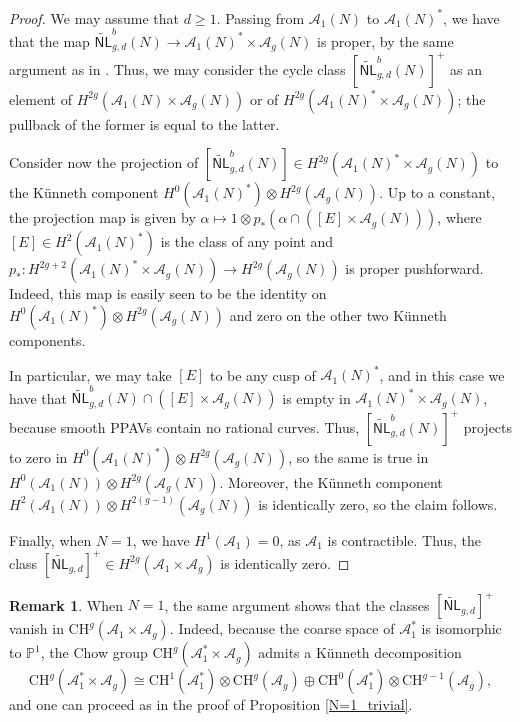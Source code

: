 \documentclass[12pt]{amsart}
\def\cA{\mathcal{A}}
\def\bP{\mathbb{P}}
\newcommand{\CH}{\mathrm{CH}}
\newcommand{\wNL}{{\widetilde{\mathsf{NL}}}}
\theoremstyle{definition}
\newtheorem{rem}[thm]{Remark}
\begin{document}
\begin{proof}
    We may assume that $d\ge 1$. Passing from $\cA_1(N)$ to $\cA_1(N)^*$, we have that the map $\wNL^b_{g,d}(N)\to \cA_1(N)^*\times\cA_g(N)$ is proper, by the same argument as in \cite[Lemma 3.4]{gl}. Thus, we may consider the cycle class $[\wNL^b_{g,d}(N)]^+$ as an element of $H^{2g}(\cA_1(N)\times\cA_g(N))$ or of $H^{2g}(\cA_1(N)^*\times\cA_g(N))$; the pullback of the former is equal to the latter. 
    
    Consider now the projection of $[\wNL^b_{g,d}(N)]\in H^{2g}(\cA_1(N)^*\times\cA_g(N))$ to the K\"{u}nneth component $H^{0}(\cA_1(N)^*)\otimes H^{2g}(\cA_g(N))$. Up to a constant, the projection map is given by $\alpha\mapsto 1\otimes p_{*}(\alpha\cap ([E]\times\cA_g(N)))$, where $[E]\in H^2(\cA_1(N)^*)$ is the class of any point and $p_{*}:H^{2g+2}(\cA_1(N)^*\times\cA_g(N))\to H^{2g}(\cA_g(N))$ is proper pushforward. Indeed, this map is easily seen to be the identity on $H^{0}(\cA_1(N)^*)\otimes H^{2g}(\cA_g(N))$ and zero on the other two K\"{u}nneth components.

    In particular, we may take $[E]$ to be any cusp of $\cA_1(N)^{*}$, and in this case we have that $\wNL^b_{g,d}(N)\cap ([E]\times \cA_g(N))$ is empty in $\cA_1(N)^*\times\cA_g(N)$, because smooth PPAVs contain no rational curves. Thus, $[\wNL^b_{g,d}(N)]^+$ projects to zero in $H^{0}(\cA_1(N)^*)\otimes H^{2g}(\cA_g(N))$, so the same is true in $H^{0}(\cA_1(N))\otimes H^{2g}(\cA_g(N))$. Moreover, the K\"{u}nneth component $H^{2}(\cA_1(N))\otimes H^{2(g-1)}(\cA_g(N))$ is identically zero, so the claim follows.
    
    Finally, when $N=1$, we have $H^{1}(\cA_1)=0$, as $\cA_1$ is contractible. Thus, the class $[\wNL_{g,d}]^+
    \in H^{2g}(\cA_1\times\cA_g)$ is identically zero.
\end{proof}

\begin{rem}\label{chow_vanish_remark}
When $N=1$, the same argument shows that the classes $[\wNL_{g,d}]^+$ vanish in $\CH^{g}(\cA_1\times\cA_g)$. Indeed, because the coarse space of $\cA_1^{*}$ is isomorphic to $\bP^1$, the Chow group $\CH^{g}(\cA_1^{*}\times\cA_g)$ admits a K\"{u}nneth decomposition
\begin{equation*}
    \CH^{g}(\cA^{*}_1\times\cA_g)\cong \CH^{1}(\cA^{*}_1)\otimes \CH^g(\cA_g)\oplus  \CH^{0}(\cA^{*}_1)\otimes \CH^{g-1}(\cA_g),
\end{equation*}
and one can proceed as in the proof of Proposition \ref{N=1_trivial}.
\end{rem}
\end{document}
